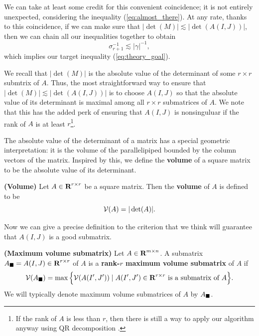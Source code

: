 \documentclass{article}
\begin{document}
	We can take at least some credit for this convenient coincidence; it is not entirely unexpected, considering the inequality (\ref{eq:almost_there}). At any rate, thanks to this coincidence, if we can make sure that $|\det(M)| \lesssim |\det(A(I,J))|$, then we can chain all our inequalities together to obtain
	\begin{equation}
		\sigma_{r+1}^{-1} \lesssim |\gamma|^{-1},
	\end{equation}
	which implies our target inequality (\ref{eq:theory_goal}).
	
	We recall that $|\det(M)|$ is the absolute value of the determinant of some $r\times r$ submtrix of $A$. Thus, the most straightforward way to ensure that $|\det(M)|\lesssim |\det(A(I,J))|$ is to choose $A(I,J)$ so that the absolute value of its determinant is maximal among all $r\times r$ submatrices of $A$.  We note that this has the added perk of ensuring that $A(I,J)$ is nonsinguluar if the rank of $A$ is at least $r$\footnote{If the rank of $A$ is less than $r$, then there is still a way to apply our algorithm anyway using QR decomposition \cite{goreinov_2010}.}.
	
	The absolute value of the determinant of a matrix has a special geometric interpretation: it is the volume of the parallelipiped bounded by the column vectors of the matrix. Inspired by this, we define the \textbf{volume} of a square matrix to be the absolute value of its determinant.
	
	\begin{dfn} \textnormal{\bf(Volume)}
		\label{def:volume}
		Let $A \in \textnormal{\bf R}^{r\times r}$ be a square matrix. Then the \textbf{volume} of $A$ is defined to be
		\begin{equation}
			\mathcal{V}(A) = |\det(A)|.
		\end{equation}
	\end{dfn}
	
	Now we can give a precise definition to the criterion that we think will guarantee that $A(I,J)$ is a good submatrix.
	
	\begin{dfn} \textnormal{\bf(Maximum volume submatrix)}
		\label{def:max_volume_submatrix}
		Let $A \in \textnormal{\bf R}^{m\times n}$. A submatrix $A_\blacksquare = A(I,J) \in \textnormal{\bf R}^{r\times r}$ of $A$ is a \textbf{rank-$r$ maximum volume submatrix} of $A$ if
		\begin{equation}
			\mathcal{V}(A_\blacksquare) = \max\Big\{\mathcal{V}(A(I', J')) \mid A(I',J') \in \textnormal{\bf R}^{r\times r} \textnormal{ is a submatrix of } A\Big\}.
		\end{equation}
		We will typically denote maximum volume submatrices of $A$ by $A_\blacksquare$.
	\end{dfn}
	
\end{document}
